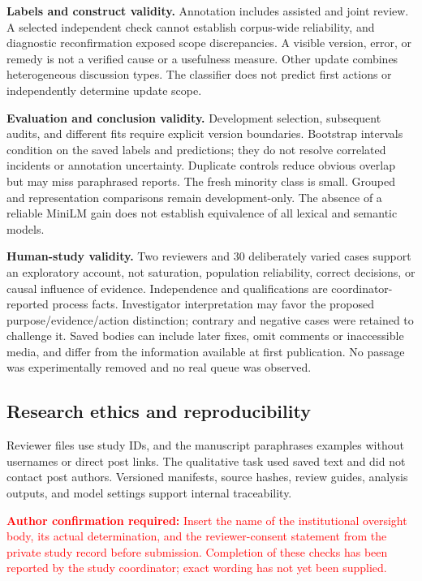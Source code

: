 \documentclass[conference,letterpaper]{IEEEtran}
\newcommand{\authorcheck}[1]{\par\noindent\textcolor{red}{\textbf{Author confirmation required:} #1}\par}
\begin{document}
\textbf{Labels and construct validity.} Annotation includes assisted and joint review. A selected independent check cannot establish corpus-wide reliability, and diagnostic reconfirmation exposed scope discrepancies. A visible version, error, or remedy is not a verified cause or a usefulness measure. Other update combines heterogeneous discussion types. The classifier does not predict first actions or independently determine update scope.

\textbf{Evaluation and conclusion validity.} Development selection, subsequent audits, and different fits require explicit version boundaries. Bootstrap intervals condition on the saved labels and predictions; they do not resolve correlated incidents or annotation uncertainty. Duplicate controls reduce obvious overlap but may miss paraphrased reports. The fresh minority class is small. Grouped and representation comparisons remain development-only. The absence of a reliable MiniLM gain does not establish equivalence of all lexical and semantic models.

\textbf{Human-study validity.} Two reviewers and 30 deliberately varied cases support an exploratory account, not saturation, population reliability, correct decisions, or causal influence of evidence. Independence and qualifications are coordinator-reported process facts. Investigator interpretation may favor the proposed purpose/evidence/action distinction; contrary and negative cases were retained to challenge it. Saved bodies can include later fixes, omit comments or inaccessible media, and differ from the information available at first publication. No passage was experimentally removed and no real queue was observed.

\subsection{Research ethics and reproducibility}
Reviewer files use study IDs, and the manuscript paraphrases examples without usernames or direct post links. The qualitative task used saved text and did not contact post authors. Versioned manifests, source hashes, review guides, analysis outputs, and model settings support internal traceability.

\authorcheck{Insert the name of the institutional oversight body, its actual determination, and the reviewer-consent statement from the private study record before submission. Completion of these checks has been reported by the study coordinator; exact wording has not yet been supplied.}
\end{document}
